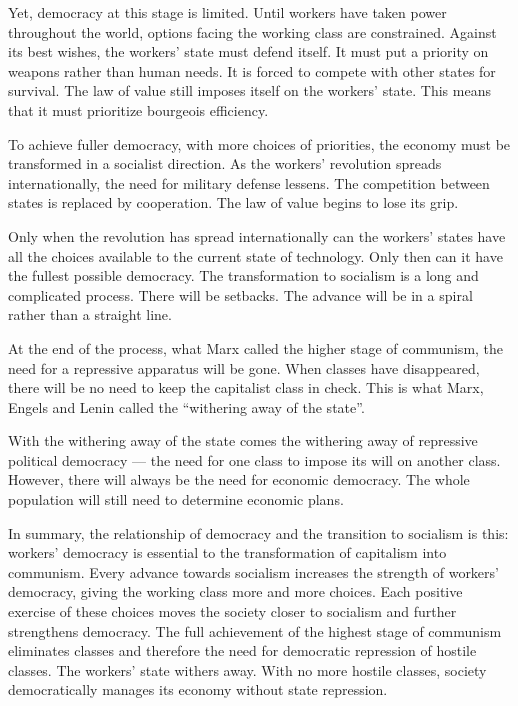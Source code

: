 Yet, democracy at this stage is limited. Until workers have taken power throughout the world, options facing the working class are constrained. Against its best wishes, the workers’ state must defend itself. It must put a priority on weapons rather than human needs. It is forced to compete with other states for survival. The law of value still imposes itself on the workers’ state. This means that it must prioritize bourgeois efficiency.

To achieve fuller democracy, with more choices of priorities, the economy must be transformed in a socialist direction. As the workers’ revolution spreads internationally, the need for military defense lessens. The competition between states is replaced by cooperation. The law of value begins to lose its grip.

Only when the revolution has spread internationally can the workers’ states have all the choices available to the current state of technology. Only then can it have the fullest possible democracy. The transformation to socialism is a long and complicated process. There will be setbacks. The advance will be in a spiral rather than a straight line.

At the end of the process, what Marx called the higher stage of communism, the need for a repressive apparatus will be gone. When classes have disappeared, there will be no need to keep the capitalist class in check. This is what Marx, Engels and Lenin called the “withering away of the state”.

With the withering away of the state comes the withering away of repressive political democracy — the need for one class to impose its will on another class. However, there will always be the need for economic democracy. The whole population will still need to determine economic plans.

In summary, the relationship of democracy and the transition to socialism is this: workers’ democracy is essential to the transformation of capitalism into communism. Every advance towards socialism increases the strength of workers’ democracy, giving the working class more and more choices. Each positive exercise of these choices moves the society closer to socialism and further strengthens democracy. The full achievement of the highest stage of communism eliminates classes and therefore the need for democratic repression of hostile classes. The workers’ state withers away. With no more hostile classes, society democratically manages its economy without state repression.
